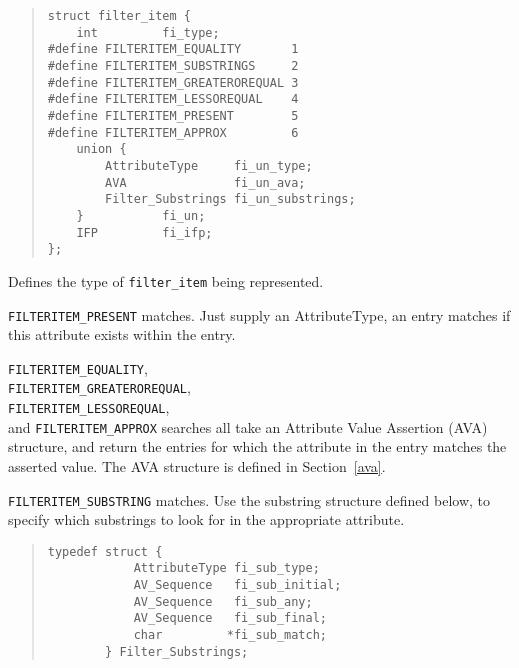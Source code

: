 \begin{quote}\small\begin{verbatim}
struct filter_item {
    int         fi_type;
#define FILTERITEM_EQUALITY       1
#define FILTERITEM_SUBSTRINGS     2
#define FILTERITEM_GREATEROREQUAL 3
#define FILTERITEM_LESSOREQUAL    4
#define FILTERITEM_PRESENT        5
#define FILTERITEM_APPROX         6
    union {
        AttributeType     fi_un_type;
        AVA               fi_un_ava;
        Filter_Substrings fi_un_substrings;
    }           fi_un;
    IFP         fi_ifp;
};
\end{verbatim}\end{quote}

\begin{describe}
\item [\verb"fi\_type":] Defines the type of \verb"filter_item" being represented.
\item [\verb"fi\_un.fi\_un\_type":] \verb"FILTERITEM_PRESENT"
matches. Just supply an AttributeType, an entry matches if this attribute
exists within the entry.

\item [\verb"fi\_un.fi\_un\_ava":] \verb"FILTERITEM_EQUALITY",\\
\verb"FILTERITEM_GREATEROREQUAL",\\
 \verb"FILTERITEM_LESSOREQUAL",\\ and
\verb"FILTERITEM_APPROX" searches all
take an Attribute Value Assertion (AVA) structure, and return the entries
for which the attribute in the entry matches the asserted value.
The AVA structure is defined in Section~\ref{ava}.

\item [\verb"fi\_un.un\_substrings":] 
\verb"FILTERITEM_SUBSTRING" matches. Use the substring structure defined below, to specify
which substrings to look for in the appropriate attribute.

\begin{quote}\small\begin{verbatim}
typedef struct {
            AttributeType fi_sub_type;
            AV_Sequence   fi_sub_initial;
            AV_Sequence   fi_sub_any;
            AV_Sequence   fi_sub_final;
            char         *fi_sub_match; 
        } Filter_Substrings;
\end{verbatim}\end{quote}
\end{describe}

